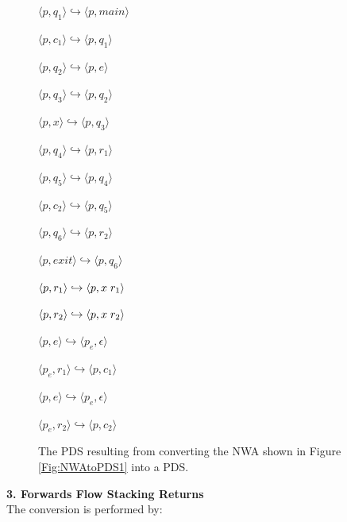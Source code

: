 \documentclass{llncs}
\begin{document}
\begin{figure}[htbp]
  \centering
    \begin{description}
      \centering
      \item $\langle p,q_1 \rangle \hookrightarrow \langle p,main \rangle$
      \item $\langle p,c_1 \rangle \hookrightarrow \langle p,q_1 \rangle$
      \item $\langle p,q_2 \rangle \hookrightarrow \langle p,e \rangle$
      \item $\langle p,q_3 \rangle \hookrightarrow \langle p,q_2 \rangle$
      \item $\langle p,x \rangle \hookrightarrow \langle p,q_3 \rangle$
      \item $\langle p,q_4 \rangle \hookrightarrow \langle p,r_1 \rangle$
      \item $\langle p,q_5 \rangle \hookrightarrow \langle p,q_4 \rangle$
      \item $\langle p,c_2 \rangle \hookrightarrow \langle p,q_5 \rangle$
      \item $\langle p,q_6 \rangle \hookrightarrow \langle p,r_2 \rangle$
      \item $\langle p,exit \rangle \hookrightarrow \langle p,q_6 \rangle$
      \item $\langle p,r_1 \rangle \hookrightarrow \langle p,x \hspace{.1cm} r_1 \rangle$
      \item $\langle p,r_2 \rangle \hookrightarrow \langle p,x \hspace{.1cm} r_2 \rangle$
      \item $\langle p,e \rangle \hookrightarrow \langle p_e, \epsilon \rangle$
      \item $\langle p_e,r_1 \rangle \hookrightarrow \langle p,c_1 \rangle$
      \item $\langle p,e \rangle \hookrightarrow \langle p_e, \epsilon \rangle$
      \item $\langle p_e,r_2 \rangle \hookrightarrow \langle p,c_2 \rangle$
    \end{description}
  \caption{The PDS resulting from converting the NWA shown in Figure \ref{Fig:NWAtoPDS1} into a PDS.}
  \label{Fig:NWAtoPDS5}
\end{figure}

\noindent \textbf{3. Forwards Flow Stacking Returns} \\

\noindent The conversion is performed by:
\end{document}
